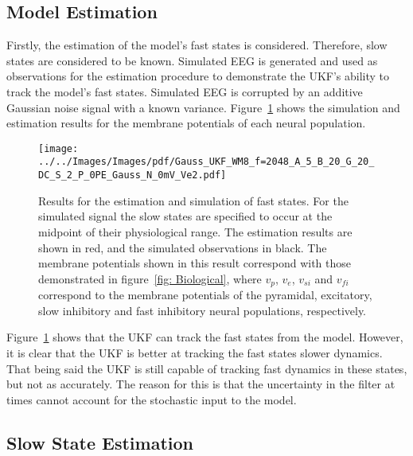 \subsection{Model Estimation}
\label{ssec: MEstimation}

Firstly, the estimation of the model's fast states is considered. Therefore, slow states are considered to be known. Simulated EEG is generated and used as observations for the estimation procedure to demonstrate the UKF's ability to track the model's fast states. Simulated EEG is corrupted by an additive Gaussian noise signal with a known variance. Figure~\ref{fig: EstFSO} shows the simulation and estimation results for the membrane potentials of each neural population.
\begin{figure}%
	\centering
		\texttt{[image: ../../Images/Images/pdf/Gauss\_UKF\_WM8\_f=2048\_A\_5\_B\_20\_G\_20\_DC\_S\_2\_P\_0PE\_Gauss\_N\_0mV\_Ve2.pdf]}
	\caption{Results for the estimation and simulation of fast states. For the simulated signal the slow states are specified to occur at the midpoint of their physiological range. The estimation results are shown in red, and the simulated observations in black. The membrane potentials shown in this result correspond with those demonstrated in figure~\ref{fig: Biological}, where $v_{p}$, $v_{e}$, $v_{si}$ and $v_{fi}$ correspond to the membrane potentials of the pyramidal, excitatory, slow inhibitory and fast inhibitory neural populations, respectively.}
	\label{fig: EstFSO}
\end{figure}%


Figure~\ref{fig: EstFSO} shows that the UKF can track the fast states from the model. However, it is clear that the UKF is better at tracking the fast states slower dynamics. That being said the UKF is still capable of tracking fast dynamics in these states, but not as accurately. The reason for this is that the uncertainty in the filter at times cannot account for the stochastic input to the model. 

\subsection{Slow State Estimation}
\label{ssec: SSEstimation}


